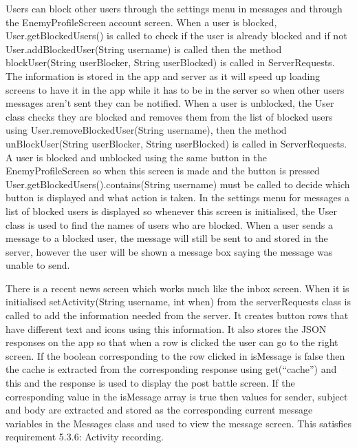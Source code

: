 Users can block other users through the settings menu in messages and through the EnemyProfileScreen account screen. When a user is blocked, User.getBlockedUsers() is called to check if the user is already blocked and if not User.addBlockedUser(String username) is called then the method blockUser(String userBlocker, String userBlocked) is called in ServerRequests. The information is stored in the app and server as it will speed up loading screens to have it in the app while it has to be in the server so when other users messages aren't sent they can be notified. When a user is unblocked, the User class checks they are blocked and removes them from the list of blocked users using User.removeBlockedUser(String username), then the method unBlockUser(String userBlocker, String userBlocked) is called in ServerRequests. A user is blocked and unblocked using the same button in the EnemyProfileScreen so when this screen is made and the button is pressed User.getBlockedUsers().contains(String username) must be called to decide which button is displayed and what action is taken. In the settings menu for messages a list of blocked users is displayed so whenever this screen is initialised, the User class is used to find the names of users who are blocked. When a user sends a message to a blocked user, the message will still be sent to and stored in the server, however the user will be shown a message box saying the message was unable to send.

There is a recent news screen which works much like the inbox screen. When it is initialised setActivity(String username, int when) from the serverRequests class is called to add the information needed from the server. It creates button rows that have different text and icons using this information. It also stores the JSON responses on the app so that when a row is clicked the user can go to the right screen. If the boolean corresponding to the row clicked in isMessage is false then the cache is extracted from the corresponding response using get(``cache'') and this and the response is used to display the post battle screen. If the corresponding value in the isMessage array is true then values for sender, subject and body are extracted and stored as the corresponding current message variables in the Messages class and used to view the message screen. This satisfies requirement 5.3.6: Activity recording.

